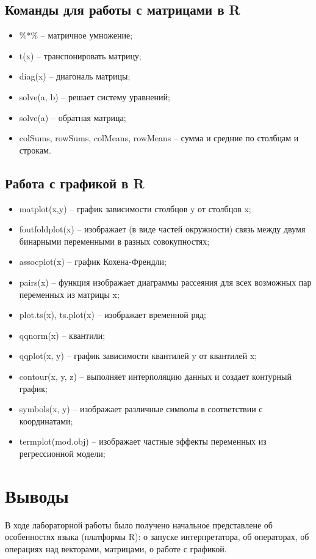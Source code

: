 \documentclass[a4paper,14pt]{extarticle}
\begin{document}
\subsection{Команды для работы с матрицами в R}
\begin{itemize}
    \item \%*\% – матричное умножение;
    \item t(x) – транспонировать матрицу;
    \item diag(x) – диагональ матрицы;
    \item solve(a, b) – решает систему уравнений;
    \item solve(a) – обратная матрица;
    \item colSums, rowSums, colMeans, rowMeans – сумма и средние по столбцам и строкам.
\end{itemize}

\subsection{Работа с графикой в R}
\begin{itemize}
    \item matplot(x,y) – график зависимости столбцов y от столбцов x;
    \item foutfoldplot(x) – изображает (в виде частей окружности) связь между
          двумя бинарными переменными в разных совокупностях;
    \item assocplot(x) – график Кохена-Френдли;
    \item pairs(x) – функция изображает диаграммы рассеяния для всех возможных
          пар переменных из матрицы x;
    \item plot.ts(x), ts.plot(x) – изображает временной ряд;
    \item qqnorm(x) – квантили;
    \item qqplot(x, y) – график зависимости квантилей y от квантилей x;
    \item contour(x, y, z) – выполняет интерполяцию данных и создает контурный
          график;
    \item symbols(x, y) – изображает различные символы в соответствии с
          координатами;
    \item termplot(mod.obj) – изображает частные эффекты переменных из
          регрессионной модели;
\end{itemize}

\section*{Выводы}
В ходе лабораторной работы было получено начальное представлене об особенностях
языка (платформы R): о запуске интерпретатора, об операторах, об операциях над
векторами, матрицами, о работе с графикой.
\end{document}
